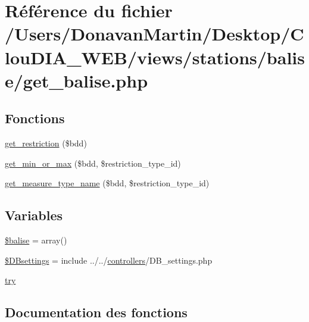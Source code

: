 \hypertarget{get__balise_8php}{}\section{Référence du fichier /\+Users/\+Donavan\+Martin/\+Desktop/\+Clou\+D\+I\+A\+\_\+\+W\+E\+B/views/stations/balise/get\+\_\+balise.php}
\label{get__balise_8php}
\subsection*{Fonctions}
\begin{DoxyCompactItemize}
\item 
\hyperlink{get__balise_8php_a564925c73bce7e8ca79969e3346d1f59}{get\+\_\+restriction} (\$bdd)
\item 
\hyperlink{get__balise_8php_a0c813e0d22cd714e486b5c1efb237180}{get\+\_\+min\+\_\+or\+\_\+max} (\$bdd, \$restriction\+\_\+type\+\_\+id)
\item 
\hyperlink{get__balise_8php_ac9fff3cf85351455af6ec1dfbe718ca8}{get\+\_\+measure\+\_\+type\+\_\+name} (\$bdd, \$restriction\+\_\+type\+\_\+id)
\end{DoxyCompactItemize}
\subsection*{Variables}
\begin{DoxyCompactItemize}
\item 
\hyperlink{get__balise_8php_ad603615727f3198e72bfbe68781281bc}{\$balise} = array()
\item 
\hyperlink{get__balise_8php_a9d97b484ee351b8e6034d74504996e9f}{\$\+D\+Bsettings} = include \textquotesingle{}../../\hyperlink{index_8js_ae15548a4836771e65070b7b408b2d46a}{controllers}/D\+B\+\_\+settings.\+php\textquotesingle{}
\item 
\hyperlink{get__balise_8php_abe4cc9788f52e49485473dc699537388}{try}
\end{DoxyCompactItemize}


\subsection{Documentation des fonctions}
\hypertarget{get__balise_8php_ac9fff3cf85351455af6ec1dfbe718ca8}{}
